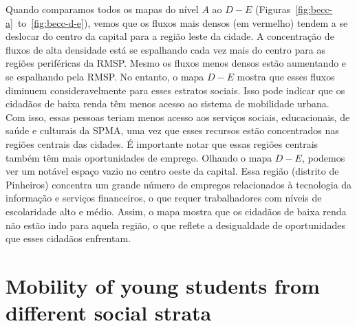 Quando comparamos todos os mapas do nível $A$ ao $D-E$
(Figuras~\ref{fig:becc-a}~to~\ref{fig:becc-d-e}), vemos que os fluxos mais
densos (em vermelho) tendem a se deslocar do centro da capital para a região
leste da cidade. A concentração de fluxos de alta densidade está se espalhando
cada vez mais do centro para as regiões periféricas da RMSP. Mesmo os fluxos
menos densos estão aumentando e se espalhando pela RMSP. No entanto, o mapa
$D-E$ mostra que esses fluxos diminuem consideravelmente para esses estratos
sociais. Isso pode indicar que os cidadãos de baixa renda têm menos acesso ao
sistema de mobilidade urbana. Com isso, essas pessoas teriam menos acesso aos
serviços sociais, educacionais, de saúde e culturais da SPMA, uma vez que esses
recursos estão concentrados nas regiões centrais das cidades. É importante
notar que essas regiões centrais também têm mais oportunidades de emprego.
Olhando o mapa $D-E$, podemos ver um notável espaço vazio no centro oeste da capital. Essa
região (distrito de Pinheiros) concentra um grande número de empregos
relacionados à tecnologia da informação e serviços financeiros, o que requer
trabalhadores com níveis de escolaridade alto e médio. Assim, o mapa mostra que
os cidadãos de baixa renda não estão indo para aquela região, o que reflete a
desigualdade de oportunidades que esses cidadãos enfrentam.

\section{Mobility of young students from different social strata}
\label{sec:students}


